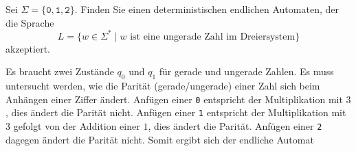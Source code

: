 Sei $\Sigma=\{\texttt{0},\texttt{1},\texttt{2}\}$.
Finden Sie einen deterministischen endlichen Automaten, der die
Sprache
\[
L
=
\{
w\in \Sigma^*
\mid
\text{$w$ ist eine ungerade Zahl im Dreiersystem}
\}
\]
akzeptiert.

\begin{loesung}
Es braucht zwei Zustände $q_0$ und $q_1$ für gerade und ungerade
Zahlen.
Es muss untersucht werden, wie die Parität (gerade/ungerade) einer
Zahl sich beim Anhängen einer Ziffer ändert.
Anfügen einer \texttt{0} entspricht der Multiplikation mit $3$,
dies ändert die Parität nicht.
Anfügen einer \texttt{1} entspricht der Multiplikation mit $3$
gefolgt von der Addition einer $1$, dies ändert die Parität.
Anfügen einer \texttt{2} dagegen ändert die Parität nicht.
Somit ergibt sich der endliche Automat
\begin{center}
\end{center}
\end{loesung}
